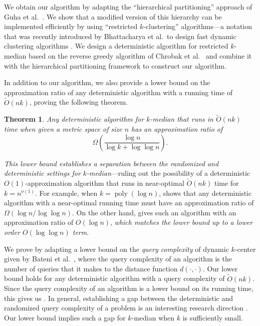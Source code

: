 \documentclass[11pt]{article}
\newcommand{\1}{\mathmybb{1}}
\newtheorem{theorem}{Theorem}[section]
\DeclareMathOperator*{\poly}{poly}
\begin{document}
We obtain our algorithm by adapting the ``hierarchical partitioning'' approach of Guha et al.~\cite{focs/GuhaMMO00}. We show that a modified version of this hierarchy can be implemented efficiently by using ``restricted $k$-clustering'' algorithms---a notation that was recently introduced by Bhattacharya et al.~to design fast dynamic clustering algorithms \cite{focs/BCLP24}. We design a deterministic algorithm for restricted $k$-median based on the reverse greedy algorithm of Chrobak et al.~\cite{ChrobakKY06} and combine it with the hierarchical partitioning framework to construct our algorithm.









In addition to our algorithm, we also provide a lower bound on the approximation ratio of any deterministic algorithm with a running time of $\tilde O(nk)$, proving the following theorem.

\begin{theorem}\label{thm:main:lower}
    Any deterministic algorithm for $k$-median that runs in $\tilde O(nk)$ time when given a metric space of size $n$ has an approximation ratio of
    $$ \Omega \! \left( \frac{\log n}{\log k + \log \log n} \right). $$
\end{theorem}

\emph{This lower bound establishes a separation between the randomized and deterministic settings for $k$-median}---ruling out the possibility of a deterministic $O(1)$-approximation algorithm that runs in near-optimal $\tilde O(nk)$ time for $k = n^{o(1)}$. For example, when $k = \poly(\log n)$, 
 shows that any deterministic algorithm with a near-optimal running time must have an approximation ratio of $\Omega(\log n / \log \log n)$. 
On the other hand,  gives such an algorithm with an approximation ratio of $O(\log n)$, \emph{which matches the lower bound up to a lower order $O (\log \log n)$ term}.


We prove  by adapting a lower bound on the \emph{query complexity} of dynamic $k$-center given by Bateni et al.~\cite{BateniEFHJMW23}, where the query complexity of an algorithm is the number of queries that it makes to the distance function $d(\cdot, \cdot)$.
Our lower bound holds for any deterministic algorithm with a query complexity of $\tilde O(nk)$.
Since the query complexity of an algorithm is a lower bound on its running time, this gives us .
In general, establishing a gap between the deterministic and randomized query complexity of a problem is an interesting research direction \cite{MN20}. Our lower bound implies such a gap for $k$-median when $k$ is sufficiently small.
\end{document}
